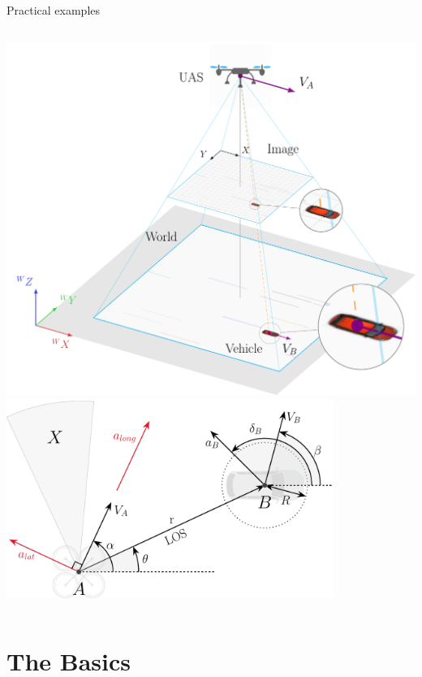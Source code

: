 \documentclass[mathserif,dvipsnames,table,xcdraw]{beamer}
\begin{document}
\begin{frame}{Practical examples}
	\begin{columns}
			\includegraphics[width=\textwidth]{../figures/intro.pdf}
			\includegraphics[width=0.8\textwidth]{../figures/engagement_geom.pdf}
	\end{columns}
\end{frame}


\section[The Basics]{The Basics}
\label{sec:the_basics}
\end{document}
